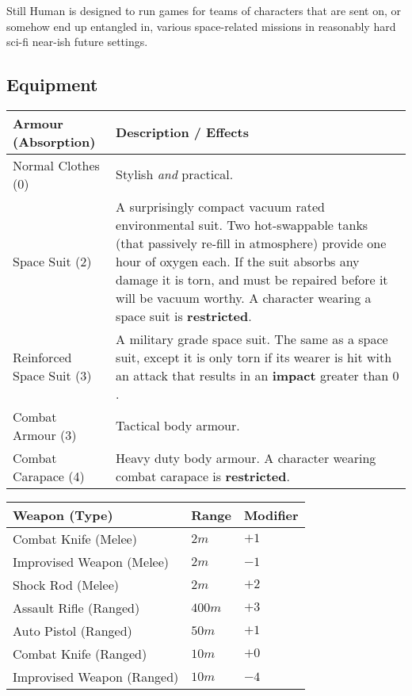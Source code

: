 \documentclass[11pt]{article}
\begin{document}
\begin{multicols}{3}
  Still Human is designed to run games for teams of characters that are sent on,
  or somehow end up entangled in, various space-related missions in reasonably
  hard sci-fi near-ish future settings.

  \subsection*{Equipment}

  \begin{tabularx}{\linewidth}{lX}
    Armour (Absorption) & Description / Effects \\
    \hline
    Normal Clothes (0) & Stylish \textit{and} practical. \\
    Space Suit (2) & A surprisingly compact vacuum rated environmental suit. Two
      hot-swappable tanks (that passively re-fill in atmosphere) provide one
      hour of oxygen each. If the suit absorbs any damage it is torn, and must
      be repaired before it will be vacuum worthy. A character wearing a space
      suit is \textbf{restricted}. \\
    Reinforced Space Suit (3) & A military grade space suit. The same as a space
      suit, except it is only torn if its wearer is hit with an attack that
      results in an \textbf{impact} greater than $0$. \\
    Combat Armour (3) & Tactical body armour. \\
    Combat Carapace (4) & Heavy duty body armour. A character wearing combat 
      carapace is \textbf{restricted}.
  \end{tabularx}

  \begin{tabularx}{\linewidth}{lXX}
    Weapon (Type) & Range & Modifier \\
    \hline
    Combat Knife (Melee) & $2m$ & $+1$ \\
    Improvised Weapon (Melee) & $2m$ & $-1$ \\
    Shock Rod (Melee) & $2m$ & $+2$ \\
    Assault Rifle (Ranged) & $400m$ & $+3$ \\
    Auto Pistol (Ranged) & $50m$ & $+1$ \\
    Combat Knife (Ranged) & $10m$ & $+0$ \\
    Improvised Weapon (Ranged) & $10m$ & $-4$
  \end{tabularx}


\end{multicols}
\end{document}
